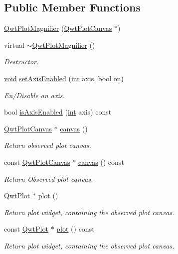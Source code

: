 \subsection*{Public Member Functions}
\begin{DoxyCompactItemize}
\item 
\hyperlink{class_qwt_plot_magnifier_ab60fc56ac5a3f2e9ab879f0a9be0fdb9}{Qwt\-Plot\-Magnifier} (\hyperlink{class_qwt_plot_canvas}{Qwt\-Plot\-Canvas} $\ast$)
\item 
virtual \hyperlink{class_qwt_plot_magnifier_a38c0508241885ea49542cc0f11c740df}{$\sim$\-Qwt\-Plot\-Magnifier} ()
\begin{DoxyCompactList}\small\item\em Destructor. \end{DoxyCompactList}\item 
\hyperlink{group___u_a_v_objects_plugin_ga444cf2ff3f0ecbe028adce838d373f5c}{void} \hyperlink{class_qwt_plot_magnifier_ac8806df408b5ed9eac79cd38e5fc1508}{set\-Axis\-Enabled} (\hyperlink{ioapi_8h_a787fa3cf048117ba7123753c1e74fcd6}{int} axis, bool on)
\begin{DoxyCompactList}\small\item\em En/\-Disable an axis. \end{DoxyCompactList}\item 
bool \hyperlink{class_qwt_plot_magnifier_acb4c33465bdd3c19c07ea3fa836c1f8d}{is\-Axis\-Enabled} (\hyperlink{ioapi_8h_a787fa3cf048117ba7123753c1e74fcd6}{int} axis) const 
\item 
\hyperlink{class_qwt_plot_canvas}{Qwt\-Plot\-Canvas} $\ast$ \hyperlink{class_qwt_plot_magnifier_a947d94f9517bb096851738b5c2bf4b7d}{canvas} ()
\begin{DoxyCompactList}\small\item\em Return observed plot canvas. \end{DoxyCompactList}\item 
const \hyperlink{class_qwt_plot_canvas}{Qwt\-Plot\-Canvas} $\ast$ \hyperlink{class_qwt_plot_magnifier_aadc3279e94ae3aad04824377b2d93829}{canvas} () const 
\begin{DoxyCompactList}\small\item\em Return Observed plot canvas. \end{DoxyCompactList}\item 
\hyperlink{class_qwt_plot}{Qwt\-Plot} $\ast$ \hyperlink{class_qwt_plot_magnifier_ae0197fb4f393e149585ff62f8e29cea6}{plot} ()
\begin{DoxyCompactList}\small\item\em Return plot widget, containing the observed plot canvas. \end{DoxyCompactList}\item 
const \hyperlink{class_qwt_plot}{Qwt\-Plot} $\ast$ \hyperlink{class_qwt_plot_magnifier_a2cc4ae00009f34f54880aea9e9837826}{plot} () const 
\begin{DoxyCompactList}\small\item\em Return plot widget, containing the observed plot canvas. \end{DoxyCompactList}\end{DoxyCompactItemize}
